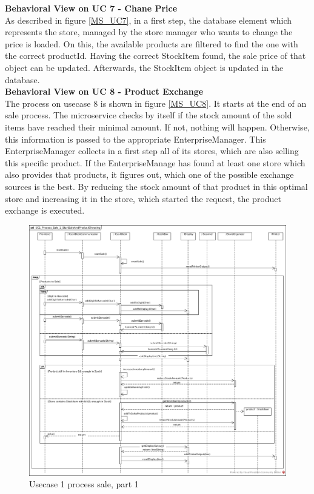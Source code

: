 		\textbf{Behavioral View on UC 7 - Chane Price} \\
		As described in figure \ref{MS_UC7}, in a first step, the database element which represents the store, managed by the store manager who wants to change the price is loaded. On this, the available products are filtered to find the one with the correct productId. 
		Having the correct StockItem found, the sale price of that object can be updated. Afterwards, the StockItem object is updated in the database.\\
		
		\textbf{Behavioral View on UC 8 - Product Exchange} \\
		The process on usecase 8 is shown in figure \ref{MS_UC8}. It starts at the end of an sale process. The microservice checks by itself if the stock amount of the sold items have reached their minimal amount. If not, nothing will happen. Otherwise, this information is passed to the appropriate EnterpriseManager. 
		This EnterpriseManager collects in a first step all of its stores, which are also selling this specific product.
		If the EnterpriseManage has found at least one store which also provides that products, it figures out, which one of the possible exchange sources is the best. By reducing the stock amount of that product in this optimal store and increasing it in the store, which started the request, the product exchange is executed.
		
			\begin{figure}[!h]
				\centering
				\includegraphics[width = 1\textwidth]{img/UC1_Process_Sale_1_StartSaleAndProductChoosing.jpg}
				\caption{Usecase 1 process sale, part 1}
				\label{MS_UC1_1}
			\end{figure}
			
